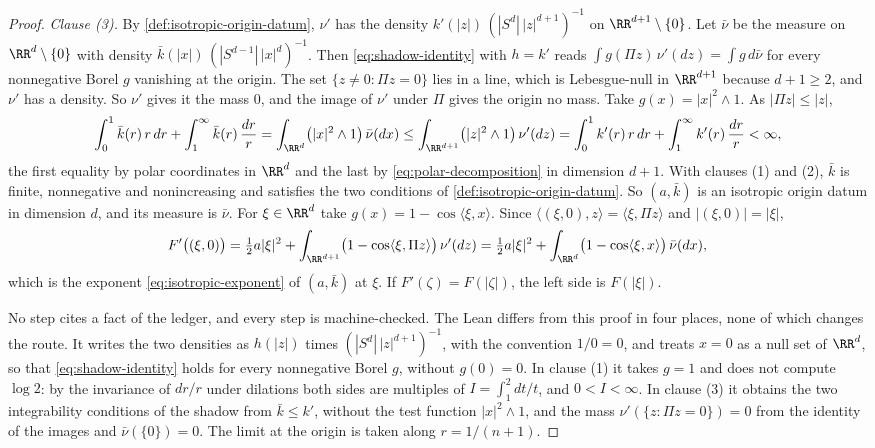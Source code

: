 \begin{proof}
\emph{Clause (3).} By \ref{def:isotropic-origin-datum}, $\nu'$ has the density
$k'(|z|)\,(|S^{d}|\,|z|^{d+1})^{-1}$ on $\RR^{d+1} \setminus \{0\}$. Let $\bar\nu$ be the measure
on $\RR^d \setminus \{0\}$ with density $\bar k(|x|)\,(|S^{d-1}|\,|x|^{d})^{-1}$. Then
\ref{eq:shadow-identity} with $h = k'$ reads $\int g(\Pi z)\,\nu'(dz) = \int g\,d\bar\nu$ for
every nonnegative Borel $g$ vanishing at the origin. The set $\{z \ne 0 : \Pi z = 0\}$ lies in a
line, which is Lebesgue-null in $\RR^{d+1}$ because $d + 1 \ge 2$, and $\nu'$ has a density. So
$\nu'$ gives it the mass $0$, and the image of $\nu'$ under $\Pi$ gives the origin no mass. Take
$g(x) = |x|^2 \wedge 1$. As
$|\Pi z| \le |z|$,
\[
  \int_0^1 \bar k(r)\,r\,dr + \int_1^\infty \bar k(r)\,\frac{dr}{r}
   = \int_{\RR^d}\bigl(|x|^2 \wedge 1\bigr)\,\bar\nu(dx)
   \le \int_{\RR^{d+1}}\bigl(|z|^2 \wedge 1\bigr)\,\nu'(dz)
   = \int_0^1 k'(r)\,r\,dr + \int_1^\infty k'(r)\,\frac{dr}{r} < \infty ,
\]
the first equality by polar coordinates in $\RR^d$ and the last by
\ref{eq:polar-decomposition} in dimension $d + 1$. With clauses (1) and (2), $\bar k$ is finite,
nonnegative and nonincreasing and satisfies the two conditions of
\ref{def:isotropic-origin-datum}. So $(a,\bar k)$ is an isotropic origin datum in dimension $d$,
and its \Levy{} measure is $\bar\nu$. For $\xi \in \RR^d$ take $g(x) = 1 - \cos\langle\xi,x\rangle$.
Since $\langle(\xi,0),z\rangle = \langle\xi,\Pi z\rangle$ and $|(\xi,0)| = |\xi|$,
\[
  F'\bigl((\xi,0)\bigr) = \tfrac12 a|\xi|^2
     + \int_{\RR^{d+1}}\bigl(1 - \cos\langle\xi,\Pi z\rangle\bigr)\,\nu'(dz)
   = \tfrac12 a|\xi|^2 + \int_{\RR^d}\bigl(1 - \cos\langle\xi,x\rangle\bigr)\,\bar\nu(dx) ,
\]
which is the exponent \ref{eq:isotropic-exponent} of $(a,\bar k)$ at $\xi$. If
$F'(\zeta) = F(|\zeta|)$, the left side is $F(|\xi|)$.

No step cites a fact of the ledger, and every step is machine-checked. The Lean differs from
this proof in four places, none of which changes the route. It writes the two densities as
$h(|z|)$ times $(|S^{d}|\,|z|^{d+1})^{-1}$, with the convention $1/0 = 0$, and treats $x = 0$ as
a null set of $\RR^d$, so that \ref{eq:shadow-identity} holds for every nonnegative Borel $g$,
without $g(0) = 0$. In clause (1) it takes $g = 1$ and does not compute $\log 2$: by the
invariance of $dr/r$ under dilations both sides are multiples of $I = \int_1^2 dt/t$, and
$0 < I < \infty$. In clause (3) it obtains the two integrability conditions of the shadow from
$\bar k \le k'$, without the test function $|x|^2 \wedge 1$, and the mass
$\nu'(\{z : \Pi z = 0\}) = 0$ from the identity of the images and $\bar\nu(\{0\}) = 0$. The limit
at the origin is taken along $r = 1/(n+1)$.
\end{proof}

